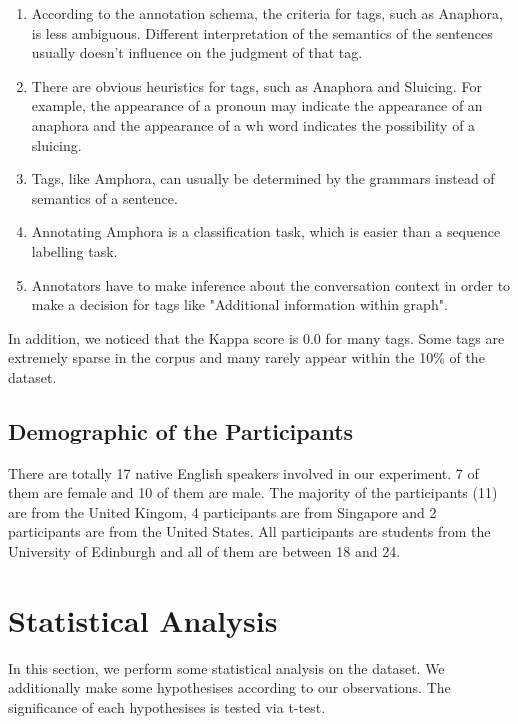 \documentclass[bsc,frontabs,twoside,singlespacing,parskip,deptreport]{infthesis}     %
\begin{document}
\begin{enumerate}

    \item According to the annotation schema, the criteria for tags, such as Anaphora, is less ambiguous. Different interpretation of the semantics of the sentences usually doesn't influence on the judgment of that tag.
    
   \item There are obvious heuristics for tags, such as Anaphora and Sluicing. For example, the appearance of a pronoun may indicate the appearance of an anaphora and the appearance of a wh word indicates the possibility of a sluicing. 

   \item Tags, like Amphora, can usually be determined by the grammars instead of semantics of a sentence. 
 
   \item Annotating Amphora is a classification task, which is easier than a sequence labelling task.
   
   \item Annotators have to make inference about the conversation context in order to make a decision for tags like "Additional information within graph".
   
\end{enumerate}

In addition, we noticed that the Kappa score is 0.0 for many tags. Some tags are extremely sparse in the corpus and many rarely appear within the 10\% of the dataset.

\subsection*{Demographic of the Participants}

There are totally 17 native English speakers involved in our experiment. 7 of them are female and 10 of them are male. The majority of the participants (11) are from the United Kingom, 4 participants are from Singapore and 2 participants are from the United States. All participants are students from the University of Edinburgh and all of them are between 18 and 24.

\section{Statistical Analysis}

In this section, we perform some statistical analysis on the dataset. We additionally make some hypothesises according to our observations. The significance of each hypothesises is tested via t-test.
\end{document}
